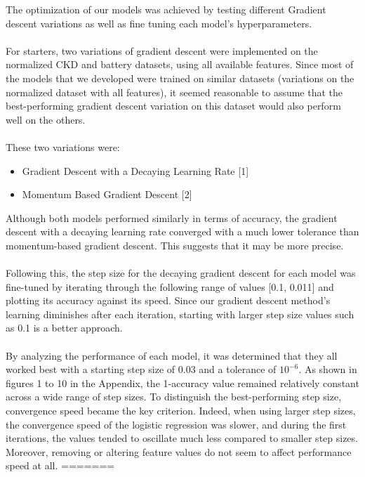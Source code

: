 \documentclass{article}
\begin{document}
The optimization of our models was achieved by testing different Gradient descent variations as well as fine tuning each model’s hyperparameters.  
\\
\\
For starters, two variations of gradient descent were implemented on the normalized CKD and battery datasets, using all available features. Since most of the models that we developed were trained on similar datasets (variations on the normalized dataset with all features), it seemed reasonable to assume that the best-performing gradient descent variation on this dataset would also perform well on the others. 
\\
\\
These two variations were: 
\begin{itemize}
  \item Gradient Descent with a Decaying Learning Rate [1]
  \item Momentum Based Gradient Descent [2]  
\end{itemize}
Although both models performed similarly in terms of accuracy, the gradient descent with a decaying learning rate converged with a much lower tolerance than momentum-based gradient descent. This suggests that it may be more precise. 
\\
\\
Following this, the step size for the decaying gradient descent for each model was fine-tuned by iterating through the following range of values [0.1, 0.011] and plotting its accuracy against its speed. Since our gradient descent method’s learning diminishes after each iteration, starting with larger step size values such as 0.1 is a better approach.  
\\
\\
By analyzing the performance of each model, it was determined that they all worked best with a starting step size of 0.03 and a tolerance of $10^{-6}$. As shown in figures 1 to 10 in the Appendix, the 1-accuracy value remained relatively constant across a wide range of step sizes. To distinguish the best-performing step size, convergence speed became the key criterion.  Indeed, when using larger step sizes, the convergence speed of the logistic regression was slower, and during the first iterations, the values tended to oscillate much less compared to smaller step sizes. Moreover, removing or altering feature values do not seem to affect performance speed at all. 
=======
\end{document}
